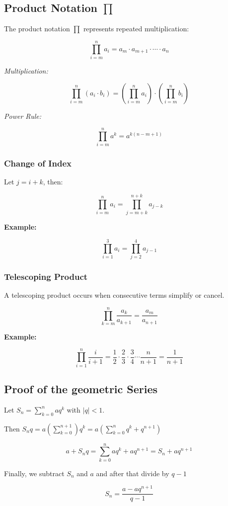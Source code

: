 \subsection{Product Notation \texorpdfstring{\(\prod\)}{∏}}

The product notation \(\prod\) represents repeated multiplication:

\[
    \prod_{i = m}^{n} a_i = a_m \cdot a_{m+1} \cdot \cdots \cdot a_n
\]

\emph{Multiplication:}
    
\[
    \prod_{i = m}^{n} (a_i \cdot b_i) = \left( \prod_{i = m}^{n} a_i \right) \cdot \left( 
    \prod_{i = m}^{n} b_i \right)
\]

\emph{Power Rule:}
    
\[
    \prod_{i = m}^{n} a^k = a^{k(n - m + 1)}
\]

\subsubsection{Change of Index}

Let \(j = i + k\), then:

\[
    \prod_{i = m}^{n} a_i = \prod_{j = m + k}^{n + k} a_{j - k}
\]

\textbf{Example:}

\[
    \prod_{i = 1}^{3} a_i = \prod_{j = 2}^{4} a_{j - 1}
\]

\subsubsection{Telescoping Product}

A telescoping product occurs when consecutive terms simplify or cancel.

\[
    \prod_{k=m}^{n} \frac{a_k}{a_{k+1}} = \frac{a_m}{a_{n+1}}
\]

\textbf{Example:}

\[
    \prod_{i = 1}^{n} \frac{i}{i+1} = \frac{1}{2} \cdot \frac{2}{3} \cdot \frac{3}{4} \cdots 
    \frac{n}{n+1} = \frac{1}{n+1}
\]

\subsection{Proof of the geometric Series}

Let \(S_n = \sum_{k = 0}^{n}aq^k\) with \(|q| < 1\).

Then \(S_n q = a(\sum_{k = 0}^{n + 1})q^k = a\left( \sum_{k= 0}^{n} q^k + q^{n + 1}\right)\)

\[
    a + S_n q = \sum_{k = 0}^{n}aq^k + aq^{n + 1}  = S_n + aq^{n + 1}
\]

Finally, we subtract \(S_n\) and \(a\) and after that divide by \(q - 1\)

\[
    S_n = \frac{a - aq^{n + 1}}{q - 1}
\]

\QED